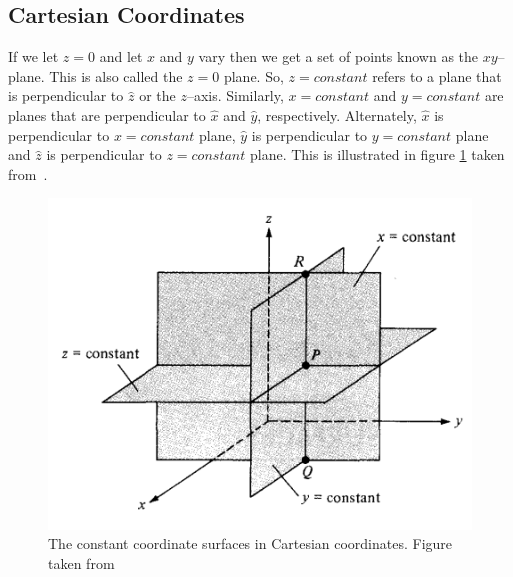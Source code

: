 \documentclass[12pt,a4paper]{article}
\begin{document}
\subsection{Cartesian Coordinates}
If we let $z=0$ and let $x$ and $y$ vary then we get a set of points known as the $xy$--plane. This is also called the $z=0$ plane. So, $z=constant$ refers to a plane that is perpendicular to $\hat z$ or the $z$--axis. Similarly, $x=constant$ and $y=constant$ are planes that are perpendicular to $\hat x$ and $\hat y$, respectively. Alternately, $\hat x$ is perpendicular to $x=constant$ plane, $\hat y$ is perpendicular to $y=constant$ plane and $\hat z$ is perpendicular to $z=constant$ plane. This is illustrated in figure \ref{Cartesian-constant} taken from~\cite[Figure 2.7, page 42]{Sadiku}.
\begin{figure}[H]
\centering
\includegraphics[scale=0.4]{Figure2-7S.png}
\caption{The constant coordinate surfaces in Cartesian coordinates. Figure taken from~\cite[Figure 2.7, page 42]{Sadiku}}
\label{Cartesian-constant}
\end{figure}
\end{document}
